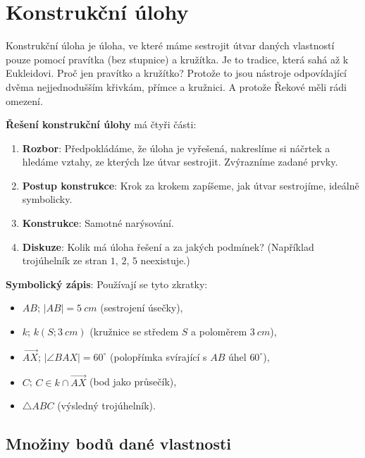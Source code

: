 \section{Konstrukční úlohy}\label{sec:konstrukcni-ulohy}

Konstrukční úloha je úloha, ve které máme sestrojit útvar daných vlastností pouze pomocí pravítka (bez stupnice) a kružítka. Je to tradice, která sahá až k Eukleidovi. Proč jen pravítko a kružítko? Protože to jsou nástroje odpovídající dvěma nejjednodušším křivkám, přímce a kružnici. A protože Řekové měli rádi omezení.

\begin{definitionbox}
  \textbf{Řešení konstrukční úlohy} má čtyři části:
  \begin{enumerate}
    \item \textbf{Rozbor}: Předpokládáme, že úloha je vyřešená, nakreslíme si náčrtek a hledáme vztahy, ze kterých lze útvar sestrojit. Zvýrazníme zadané prvky.
    \item \textbf{Postup konstrukce}: Krok za krokem zapíšeme, jak útvar sestrojíme, ideálně symbolicky.
    \item \textbf{Konstrukce}: Samotné narýsování.
    \item \textbf{Diskuze}: Kolik má úloha řešení a za jakých podmínek? (Například trojúhelník ze stran $1$, $2$, $5$ neexistuje.)
  \end{enumerate}
\end{definitionbox}

\begin{definitionbox}
  \textbf{Symbolický zápis}: Používají se tyto zkratky:
  \begin{itemize}
    \item $AB$; $|AB| = 5\ \si{cm}$ \quad (sestrojení úsečky),
    \item $k$; $k(S; 3\ \si{cm})$ \quad (kružnice se středem $S$ a poloměrem $3\ \si{cm}$),
    \item $\overrightarrow{AX}$; $|\angle BAX| = 60^\circ$ \quad (polopřímka svírající s $AB$ úhel $60^\circ$),
    \item $C$; $C\in k\cap\overrightarrow{AX}$ \quad (bod jako průsečík),
    \item $\triangle ABC$ \quad (výsledný trojúhelník).
  \end{itemize}
\end{definitionbox}

\subsection{Množiny bodů dané vlastnosti}\label{sec:mnoziny-bodu}

